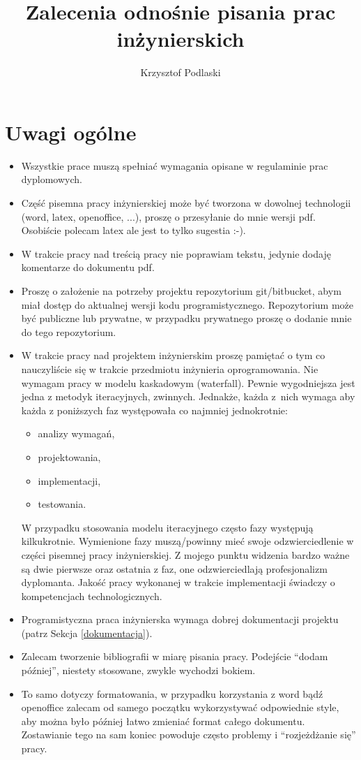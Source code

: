\documentclass[12pt,a4paper]{article}
\begin{document}
\title{Zalecenia odnośnie pisania prac inżynierskich}
\author{Krzysztof Podlaski}
\date{}
\maketitle


\section{Uwagi ogólne}
\begin{itemize}
\item Wszystkie prace muszą spełniać wymagania opisane w regulaminie prac dyplomowych.
\item Część pisemna pracy inżynierskiej może być tworzona w dowolnej technologii (word, latex, openoffice, ...), proszę o przesyłanie do mnie wersji pdf. Osobiście polecam latex ale jest to tylko sugestia :-).
\item W trakcie pracy nad treścią pracy nie poprawiam tekstu, jedynie dodaję komentarze do dokumentu pdf.
\item Proszę o założenie na potrzeby projektu repozytorium git/bitbucket, abym miał dostęp do aktualnej wersji kodu programistycznego.  Repozytorium może być publiczne lub prywatne, w przypadku prywatnego proszę o dodanie mnie do tego repozytorium.
\item W trakcie pracy nad projektem inżynierskim proszę pamiętać o tym co nauczyliście się w trakcie przedmiotu inżynieria oprogramowania. Nie wymagam pracy w modelu kaskadowym (waterfall). Pewnie wygodniejsza jest jedna z metodyk iteracyjnych, zwinnych. Jednakże, każda z~nich wymaga aby każda z poniższych faz występowała co najmniej jednokrotnie:
    \begin{itemize}
    \item analizy wymagań,
    \item projektowania,
    \item implementacji,
    \item testowania.
    \end{itemize}
    W przypadku stosowania modelu iteracyjnego często fazy występują kilkukrotnie. Wymienione fazy muszą/powinny mieć swoje odzwierciedlenie w części pisemnej pracy inżynierskiej. Z mojego punktu widzenia bardzo ważne są dwie pierwsze oraz ostatnia z faz, one odzwierciedlają profesjonalizm dyplomanta. Jakość pracy wykonanej w trakcie implementacji świadczy o kompetencjach technologicznych.
\item Programistyczna praca inżynierska wymaga dobrej dokumentacji projektu (patrz Sekcja \ref{dokumentacja}).
\item Zalecam tworzenie bibliografii w miarę pisania pracy. Podejście ``dodam później'', niestety stosowane, zwykle wychodzi bokiem.
\item To samo dotyczy formatowania, w przypadku korzystania z word bądź openoffice zalecam od samego początku wykorzystywać odpowiednie style, aby można było później łatwo zmieniać format całego dokumentu. Zostawianie tego na sam koniec powoduje często problemy i ``rozjeżdżanie się'' pracy.
\end{itemize}
\end{document}
